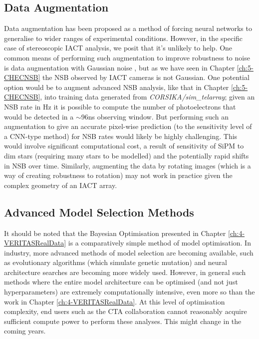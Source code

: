 \subsection{Data Augmentation}
Data augmentation has been proposed \cite{aug} as a method of forcing neural networks to generalise to wider ranges of experimental conditions. However, in the specific case of stereoscopic IACT analysis, we posit that it's unlikely to help. One common means of performing such augmentation to improve robustness to noise is data augmentation with Gaussian noise \cite{bayesdeblend}, but as we have seen in Chapter \ref{ch:5-CHECNSB} the NSB observed by IACT cameras is not Gaussian. One potential option would be to augment advanced NSB analysis, like that in Chapter \ref{ch:5-CHECNSB}, into training data generated from \textit{CORSIKA/sim\_telarray}; given an NSB rate in Hz it is possible to compute the number of photoelectrons that would be detected in a $\sim$96ns observing window. But performing such an augmentation to give an accurate pixel-wise prediction (to the sensitivity level of a CNN-type method) for NSB rates would likely be highly challenging. This would involve significant computational cost, a result of  sensitivity of SiPM to dim stars (requiring many stars to be modelled) and the potentially rapid shifts in NSB over time. Similarly, augmenting the data by rotating images (which is a way of creating robustness to rotation) may not work in practice given the complex geometry of an IACT array.

\subsection{Advanced Model Selection Methods}

It should be noted that the Bayesian Optimisation presented in Chapter \ref{ch:4-VERITASRealData} is a comparatively simple method of model optimisation. In industry, more advanced methods of model selection are becoming available, such as evolutionary algorithms \cite{evodeep} (which simulate genetic mutation) and neural architecture searches \cite{neural} are becoming more widely used. However, in general such methods where the entire model architecture can be optimised (and not just hyperparameters) are extremely computationally intensive, even more so than the work in Chapter \ref{ch:4-VERITASRealData}. At this level of optimisation complexity, end users such as the CTA collaboration cannot reasonably acquire sufficient compute power to perform these analyses. This might change in the coming years.

